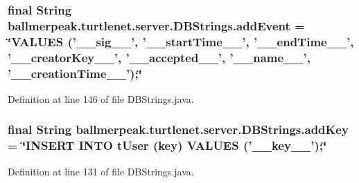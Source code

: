 \hypertarget{classballmerpeak_1_1turtlenet_1_1server_1_1DBStrings_a179f2c1d92f556d4fa74acf16cf13f7a}{
\subsubsection[{add\-Event}]{\setlength{\rightskip}{0pt plus 5cm}final String ballmerpeak.\-turtlenet.\-server.\-D\-B\-Strings.\-add\-Event = \char`\"{}V\-A\-L\-U\-E\-S ('\-\_\-\-\_\-sig\-\_\-\-\_\-', '\-\_\-\-\_\-start\-Time\-\_\-\-\_\-', '\-\_\-\-\_\-end\-Time\-\_\-\-\_\-', '\-\_\-\-\_\-creator\-Key\-\_\-\-\_\-', '\-\_\-\-\_\-accepted\-\_\-\-\_\-', '\-\_\-\-\_\-name\-\_\-\-\_\-', '\-\_\-\-\_\-creation\-Time\-\_\-\-\_\-');\char`\"{}\hspace{0.3cm}{\ttfamily [static]}}}\label{classballmerpeak_1_1turtlenet_1_1server_1_1DBStrings_a179f2c1d92f556d4fa74acf16cf13f7a}


Definition at line 146 of file D\-B\-Strings.\-java.

\hypertarget{classballmerpeak_1_1turtlenet_1_1server_1_1DBStrings_a411c712ba8bd368765dfd890abca6106}{
\subsubsection[{add\-Key}]{\setlength{\rightskip}{0pt plus 5cm}final String ballmerpeak.\-turtlenet.\-server.\-D\-B\-Strings.\-add\-Key = \char`\"{}I\-N\-S\-E\-R\-T I\-N\-T\-O t\-User (key) V\-A\-L\-U\-E\-S ('\-\_\-\-\_\-key\-\_\-\-\_\-');\char`\"{}\hspace{0.3cm}{\ttfamily [static]}}}\label{classballmerpeak_1_1turtlenet_1_1server_1_1DBStrings_a411c712ba8bd368765dfd890abca6106}


Definition at line 131 of file D\-B\-Strings.\-java.

